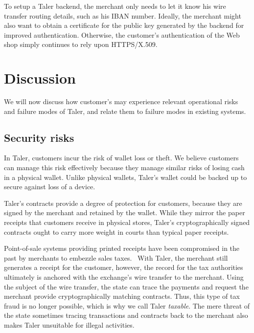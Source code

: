 \documentclass{llncs}
\begin{document}
To setup a Taler backend, the merchant only needs to let it know his wire
transfer routing details, such as his IBAN number.  Ideally, the
merchant might also want to obtain a certificate for the public key
generated by the backend for improved authentication.  Otherwise, the
customer's authentication of the Web shop simply continues to rely
upon HTTPS/X.509.


\section{Discussion}

We will now discuss how customer's may experience relevant operational
risks and failure modes of Taler, and relate them to failure modes
in existing systems.

\subsection{Security risks}

In Taler, customers incur the risk of wallet loss or theft.  We
believe customers can manage this risk effectively because they manage
similar risks of losing cash in a physical wallet.  Unlike physical
wallets, Taler's wallet could be backed up to secure against loss of a
device.

Taler's contracts provide a degree of protection for customers,
because they are signed by the merchant and retained by the wallet.
While they mirror the paper receipts that customers receive in
physical stores, Taler's cryptographically signed contracts ought to
carry more weight in courts than typical paper receipts.

Point-of-sale systems providing printed receipts have been compromised
in the past by merchants to embezzle sales
taxes.~\cite{munichicecream} With Taler, the merchant still generates
a receipt for the customer, however, the record for the tax
authorities ultimately is anchored with the exchange's wire transfer
to the merchant.  Using the subject of the wire transfer, the state
can trace the payments and request the merchant provide
cryptographically matching contracts.  Thus, this type of tax
fraud is no longer possible, which is why we call Taler {\em
taxable}.  The mere threat of the state sometimes tracing transactions
and contracts back to the merchant also makes Taler unsuitable for
illegal activities.
\end{document}

